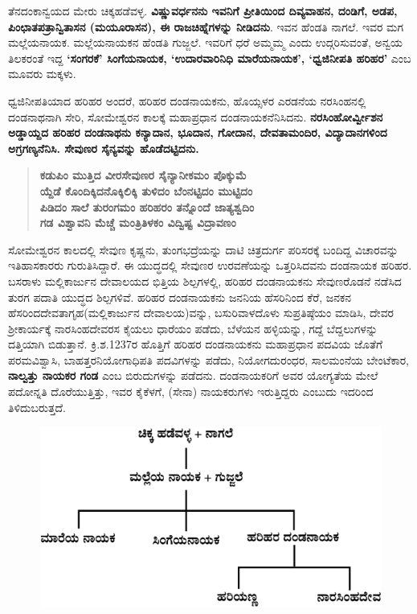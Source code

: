 ತೆನದಂಕಾನ್ವಯದ ಮೇರು ಚಿಕ್ಕಹಡೆವಳ್ಳ. \textbf{ವಿಷ್ಣುವರ್ಧನನು ಇವನಿಗೆ ಪ್ರೀತಿಯಿಂದ ದಿವ್ಯವಾಹನ, ದಂಡಿಗೆ, ಅಡಪ, ಪಿಂಛಾತಪತ್ರಾನ್ವಿತಾಸನ (ಮಯೂರಾಸನ), ಈ ರಾಜಚಿಹ್ನೆಗಳನ್ನು ನೀಡಿದನು}. ಇವನ ಹೆಂಡತಿ ನಾಗಲೆ. ಇವರ ಮಗ ಮಲ್ಲೆಯನಾಯಕ. ಮಲ್ಲೆಯನಾಯಕನ ಹೆಂಡತಿ ಗುಜ್ಜಲೆ. ಇವರಿಗೆ ಧರೆ ಅಮ್ಮಮ್ಮ ಎಂದು ಉದ್ಗರಿಸುವಂತೆ, ಅನ್ವಯ ತಿಲಕರಂತೆ ಇದ್ದ \textbf{‘ಸಂಗರಕೆ’ ಸಿಂಗೆಯನಾಯಕ, ‘ಉದಾರವಾರಿನಿಧಿ ಮಾರೆಯನಾಯಕ’, ‘ಧ್ವಜಿನೀಪತಿ ಹರಿಹರ’} ಎಂಬ ಮೂವರು ಮಕ್ಕಳು.

ಧ್ವಜಿನೀಪತಿಯಾದ ಹರಿಹರ ಅಂದರೆ, ಹರಿಹರ ದಂಡನಾಯಕನು, ಹೊಯ್ಸಳರ ಎರಡನೆಯ ನರಸಿಂಹನಲ್ಲಿ ದಂಡನಾಥ\-ನಾಗಿ ಸೇರಿ, ಸೋಮೇಶ್ವರನ ಕಾಲಕ್ಕೆ ಮಹಾಪ್ರಧಾನ ದಂಡನಾಯಕನೆನಿಸಿದನು. \textbf{ನರಸಿಂಹೋರ್ವ್ವೀಶನ ಅಡ್ಡಾಯ್ದದ ಹರಿಹರ ದಂಡನಾಥನು ಕನ್ಯಾದಾನ, ಭೂದಾನ, ಗೋದಾನ, ದೇವತಾಮಂದಿರ, ವಿದ್ಯಾದಾನಗಳಿಂದ ಅಗ್ರಗಣ್ಯನೆನಿಸಿ. ಸೇವುಣರ ಸೈನ್ಯವನ್ನು ಹೊಡೆದಟ್ಟಿದನು. }

\begin{verse}
\textbf{ಕಡುಪಿಂ ಮುತ್ತಿದ ವೀರಸೇವುಣರ ಸೈನ್ಯಾನೀಕಮಂ ಪೊಕ್ಕುಮೆ} \\\textbf{ಯ್ದೆಡೆ ಕೊಂದಿಕ್ಕಿದನೊಕ್ಕಿಲಿಕ್ಕಿ ತುಳಿದಂ ಬೆಂನಟ್ಟಿದಂ ಮುಟ್ಟಿದಂ} \\\textbf{ಪಿಡಿದಂ ಸಾಲೆ ತುರಂಗಮಂ ಹರಿಹರಂ ತನ್ನೊಂದೆ ಜಾತ್ಯಶ್ವದಿಂ} \\\textbf{ಗಡ ವಿಶ್ವಾವನಿ ಮೆಚ್ಚೆ ಮಂತ್ರಿತಿಳಕಂ ವಿದ್ವಿಷ್ಟ ವಿದ್ರಾವಣಂ }
\end{verse}

ಸೋಮೇಶ್ವರನ ಕಾಲದಲ್ಲಿ ಸೇವುಣ ಕೃಷ್ಣನು, ತುಂಗಭದ್ರೆಯನ್ನು ದಾಟಿ ಚಿತ್ರದುರ್ಗ ಪರಿಸರಕ್ಕೆ ಬಂದಿದ್ದ ವಿಚಾರವನ್ನು ಇತಿಹಾಸಕಾರರು ಗುರುತಿಸಿದ್ದಾರೆ. ಈ ಯುದ್ಧದಲ್ಲಿ ಸೇವುಣರ ಉರವಣೆಯನ್ನು ಒತ್ತರಿಸಿದವನು ದಂಡನಾಯಕ ಹರಿಹರ. ಬಸರಾಳು ಮಲ್ಲಿಕಾರ್ಜುನ ದೇವಾಲಯದ ಭಿತ್ತಿಯ ಶಿಲ್ಪಗಳಲ್ಲಿ, ಹರಿಹರ ದಂಡನಾಯಕನು ಸೇವುಣರೊಡನೆ ನಡೆಸಿದ ತುರಗ ಪದಾತಿ ಯುದ್ಧದ ಶಿಲ್ಪಗಳಿವೆ. ಹರಿಹರ ದಂಡನಾಯಕನು ಜನನಿಯ ಹೆಸರಿನಿಂದ ಕೆರೆ, ಜನಕನ ಹೆಸರಿಂದ\break ದೇವತಾಗೃಹ(ಮಲ್ಲಿಕಾರ್ಜುನ ದೇವಾಲಯ)ವನ್ನು, ಬಸುರಿವಾಳದೊಳು ಸುಪ್ರತಿಷ್ಠೆಯಂ ಮಾಡಿಸಿ, ದೇವರ ಶ‍್ರೀಕಾರ್ಯಕ್ಕೆ ನಾರಸಿಂಹದೇವರಸ ಕೈಯಲು ಧಾರೆಯಂ ಪಡೆದು, ಬೆಳೆಯನ ಹಳ್ಳಿಯನ್ನು, ಗದ್ದೆ ಬೆದ್ದಲುಗಳನ್ನು ದತ್ತಿಯಾಗಿ ಬಿಡುತ್ತಾನೆ. ಕ್ರಿ.ಶ.1237ರ ಹೊತ್ತಿಗೆ ಹರಿಹರ ದಂಡನಾಯಕನು ಮಹಾಪ್ರಧಾನ ಪದವಿಯ ಜೊತೆಗೆ ಪರಮವಿಶ್ವಾಸಿ, ಬಾಹತ್ತರ\break ನಿಯೋಗಾಧಿಪತಿ ಪದವಿಗಳನ್ನು ಪಡೆದು, ನಿಯೋಗದುರಂಧರ, ಸಾಲಮಂನೆಯ ಬೇಂಟೆಕಾರ, \textbf{ನಾಲ್ವತ್ತು ನಾಯಕರ ಗಂಡ} ಎಂಬ ಬಿರುದುಗಳನ್ನು ಪಡೆದನು. ದಂಡನಾಯಕರಿಗೆ ಅವರ ಯೋಗ್ಯತೆಯ ಮೇಲೆ ಪದೋನ್ನತಿ ದೊರೆಯುತ್ತಿತ್ತು, ಇವರ ಕೈಕೆಳಗೆ, (ಸೇನಾ) ನಾಯಕರುಗಳು ಇರುತ್ತಿದ್ದರು ಎಂಬುದು ಇದರಿಂದ ತಿಳಿದುಬರುತ್ತದೆ.

\begin{figure}[!h]
\includegraphics[scale=1.15]{images/chap3/chap3fig19.jpeg}
\end{figure}

